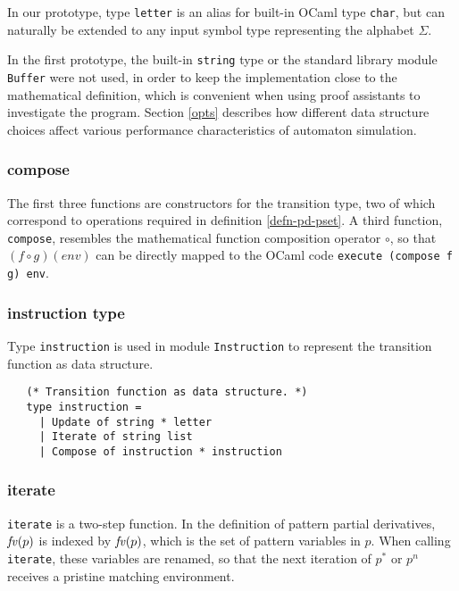 In our prototype, type \texttt{letter} is an alias for built-in OCaml type
\texttt{char}, but can naturally be extended to any input symbol type
representing the alphabet $\Sigma$.

In the first prototype, the built-in \texttt{string} type or the standard
library module \texttt{Buffer} were not used, in order to keep the
implementation close to the mathematical definition, which is convenient when
using proof assistants to investigate the program. Section \ref{opts} describes
how different data structure choices affect various performance characteristics
of automaton simulation.


\subsubsection{compose}

The first three functions are constructors for the transition type, two of which
correspond to operations required in definition \ref{defn-pd-pset}. A third
function, \texttt{compose}, resembles the mathematical function composition
operator $\circ$, so that $(f \circ g)(\mathit{env})$ can be directly mapped to
the OCaml code \texttt{execute (compose f g) env}.


\subsubsection{instruction type}

Type \texttt{instruction} is used in module \texttt{Instruction} to represent
the transition function as data structure.

\begin{lstlisting}
   (* Transition function as data structure. *)
   type instruction =
     | Update of string * letter
     | Iterate of string list
     | Compose of instruction * instruction
\end{lstlisting}


\subsubsection{iterate}

\texttt{iterate} is a two-step function. In the definition of pattern partial
derivatives, $\iteratefvp$ is indexed by $\mathit{fv}(p)$, which is the set of pattern
variables in $p$. When calling \texttt{iterate}, these variables are renamed, so
that the next iteration of $p^*$ or $p^n$ receives a pristine matching
environment.

